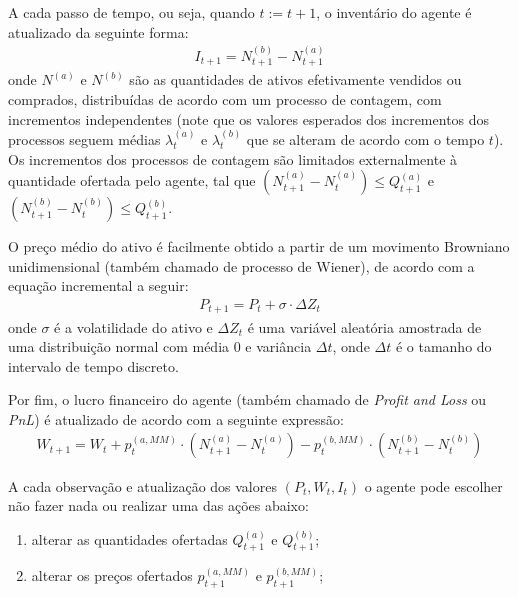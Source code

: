 A cada passo de tempo, ou seja, quando $t := t + 1$, o inventário do agente é atualizado da seguinte forma:
\begin{equation}
    \begin{aligned}
    	I_{t + 1} = N^{(b)}_{t + 1} - N^{(a)}_{t + 1} \label{eq:inventory}
    \end{aligned}
\end{equation}
onde $N^{(a)}$ e $N^{(b)}$ são as quantidades de ativos efetivamente vendidos ou comprados, distribuídas de acordo com um processo de contagem, com incrementos independentes (note que os valores esperados dos incrementos dos processos seguem médias $\lambda_{t}^{(a)}$ e $\lambda_{t}^{(b)}$ que se alteram de acordo com o tempo $t$). Os incrementos dos processos de contagem são limitados externalmente à quantidade ofertada pelo agente, tal que $(N_{t + 1}^{(a)} - N_{t}^{(a)}) \leq Q_{t + 1}^{(a)}$ e $(N_{t + 1}^{(b)} - N_{t}^{(b)}) \leq Q_{t + 1}^{(b)}$.

O preço médio do ativo é facilmente obtido a partir de um movimento Browniano unidimensional (também chamado de processo de Wiener), de acordo com a equação incremental a seguir:
\begin{equation}
	\begin{aligned}
		P_{t+1} = P_t + \sigma \cdot \Delta Z_t
		\label{eq:midprice}
	\end{aligned}
\end{equation}
onde \(\sigma\) é a volatilidade do ativo e \(\Delta Z_t\) é uma variável aleatória amostrada de uma distribuição normal com média 0 e variância \(\Delta t\), onde \(\Delta t\) é o tamanho do intervalo de tempo discreto.

Por fim, o lucro financeiro do agente (também chamado de \textit{Profit and Loss} ou \textit{PnL}) é atualizado de acordo com a seguinte expressão:
\begin{equation}
	\begin{aligned}
		W_{t + 1} = W_{t} + p^{(a, MM)}_{t} \cdot (N^{(a)}_{t + 1} - N^{(a)}_{t}) - p^{(b, MM)}_{t} \cdot (N^{(b)}_{t + 1} - N^{(b)}_{t} )
		\label{eq:pnl}
	\end{aligned}
\end{equation}

A cada observação e atualização dos valores $(P_{t}, W_{t}, I_{t})$ o agente pode escolher não fazer nada ou realizar uma das ações abaixo:
\begin{enumerate}
    \item alterar as quantidades ofertadas $Q^{(a)}_{t + 1}$ e $Q^{(b)}_{t + 1}$;
    \item alterar os preços ofertados $p^{(a, MM)}_{t + 1}$ e $p^{(b, MM)}_{t + 1}$;
\end{enumerate}

